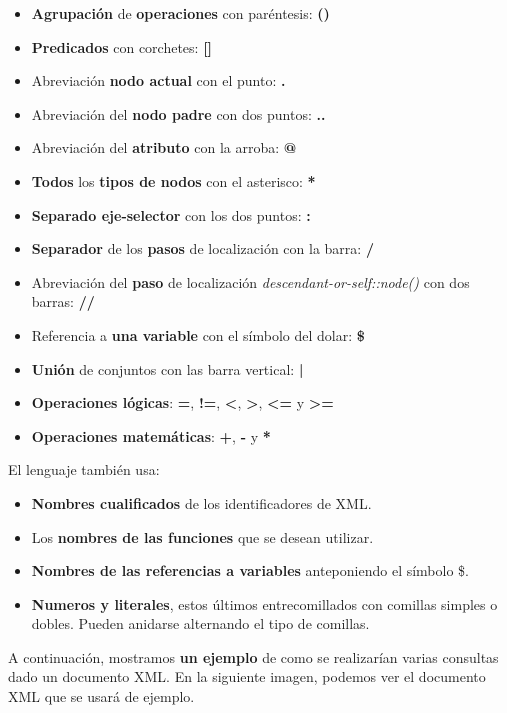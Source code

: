 \begin{itemize}
    \item \textbf{Agrupación} de \textbf{operaciones} con paréntesis: \textbf{()}
    \item \textbf{Predicados} con corchetes: \textbf{[]}
    \item Abreviación \textbf{nodo actual} con el punto: \textbf{.}
    \item Abreviación del \textbf{nodo padre} con dos puntos: \textbf{..}
    \item Abreviación del \textbf{atributo} con la arroba: \textbf{@}
    \item \textbf{Todos} los \textbf{tipos de nodos} con el asterisco: \textbf{*}
    \item \textbf{Separado eje-selector} con los dos puntos: \textbf{:}
    \item \textbf{Separador} de los \textbf{pasos} de localización con la barra: \textbf{/}
    \item Abreviación del \textbf{paso} de localización \textit{descendant-or-self::node()} con dos barras: \textbf{//}
    \item Referencia a \textbf{una variable} con el símbolo del dolar: \textbf{\$}
    \item \textbf{Unión} de conjuntos con las barra vertical: \textbf{|}
    \item \textbf{Operaciones lógicas}: \textbf{=}, \textbf{!=}, \textbf{<}, \textbf{>}, \textbf{<=} y \textbf{>=}
    \item \textbf{Operaciones matemáticas}: \textbf{+}, \textbf{-} y \textbf{*}
\end{itemize}

El lenguaje también usa:

\begin{itemize}
    \item \textbf{Nombres cualificados} de los identificadores de XML.
    \item Los \textbf{nombres de las funciones} que se desean utilizar.
    \item \textbf{Nombres de las referencias a variables} anteponiendo el símbolo \$.
    \item \textbf{Numeros y literales}, estos últimos entrecomillados con comillas simples o dobles. Pueden anidarse alternando el tipo de comillas.
\end{itemize}

A continuación, mostramos \textbf{un ejemplo} de como se realizarían varias consultas dado un documento XML. En la siguiente imagen, podemos ver el documento XML que se usará de ejemplo.

